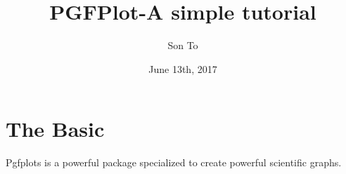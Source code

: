 \documentclass[a4paper,11pt]{article}
\author{Son To}
\date{June 13th, 2017}
\title{PGFPlot-A simple tutorial}
\begin{document}
  \maketitle
  \tableofcontents
  \clearpage
  \section{The Basic}
  Pgfplots is a powerful package specialized to create
  powerful scientific graphs.
  
\end{document}
